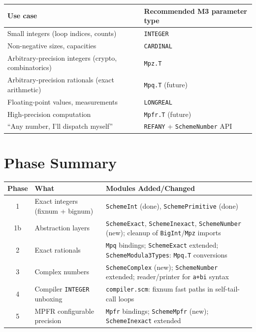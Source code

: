 \documentclass[12pt]{article}
\begin{document}
\begin{center}
\begin{tabular}{lp{7cm}}
\toprule
\textbf{Use case} & \textbf{Recommended M3 parameter type} \\
\midrule
Small integers (loop indices, counts) & {\tt INTEGER} \\
Non-negative sizes, capacities & {\tt CARDINAL} \\
Arbitrary-precision integers (crypto, combinatorics) & {\tt Mpz.T} \\
Arbitrary-precision rationals (exact arithmetic) & {\tt Mpq.T} (future) \\
Floating-point values, measurements & {\tt LONGREAL} \\
High-precision computation & {\tt Mpfr.T} (future) \\
``Any number, I'll dispatch myself'' & {\tt REFANY} + {\tt SchemeNumber} API \\
\bottomrule
\end{tabular}
\end{center}

\section{Phase Summary}
\label{sec:phases}

\begin{center}
\begin{tabular}{clp{7cm}}
\toprule
\textbf{Phase} & \textbf{What} & \textbf{Modules Added/Changed} \\
\midrule
1 & Exact integers (fixnum + bignum) &
  {\tt SchemeInt} (done), {\tt SchemePrimitive} (done) \\
1b & Abstraction layers &
  {\tt SchemeExact}, {\tt SchemeInexact}, {\tt SchemeNumber} (new);
  cleanup of {\tt BigInt}/{\tt Mpz} imports \\
2 & Exact rationals &
  {\tt Mpq} bindings; {\tt SchemeExact} extended;
  {\tt SchemeModula3Types}: {\tt Mpq.T} conversions \\
3 & Complex numbers &
  {\tt SchemeComplex} (new); {\tt SchemeNumber} extended;
  reader/printer for {\tt a+bi} syntax \\
4 & Compiler {\tt INTEGER} unboxing &
  {\tt compiler.scm}: fixnum fast paths in self-tail-call loops \\
5 & MPFR configurable precision &
  {\tt Mpfr} bindings; {\tt SchemeMpfr} (new);
  {\tt SchemeInexact} extended \\
\bottomrule
\end{tabular}
\end{center}
\end{document}
